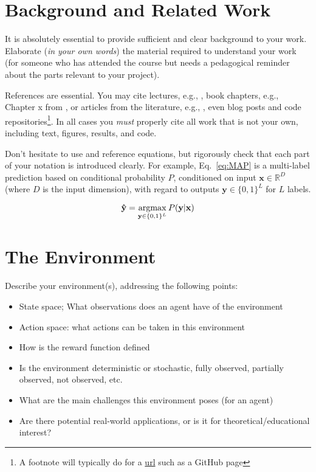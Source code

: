 \documentclass[journal, a4paper]{IEEEtran}
\newcommand{\argmax}{\operatornamewithlimits{argmax}}
\newcommand{\x}{\mathbf{x}}
\newcommand{\y}{\mathbf{y}}
\newcommand{\ypred}{\mathbf{\hat y}}
\begin{document}
\section{Background and Related Work}

It is absolutely essential to provide sufficient and clear background to your work. Elaborate (\emph{in your own words}) the material required to understand your work (for someone who has attended the course but needs a pedagogical reminder about the parts relevant to your project). 

References are essential. You may cite lectures, e.g., \cite{Lecture3}, book chapters, e.g., Chapter x from \cite{Barber}, or articles from the literature, e.g., \cite{Astar,DeepMindSC2}, even blog posts and code repositories\footnote{A footnote will typically do for a \url{url} such as a GitHub page}. In all cases you \emph{must} properly cite all work that is not your own, including text, figures, results, and code.

Don't hesitate to use and reference equations, but rigorously check that each part of your notation is introduced clearly. For example, Eq.~\eqref{eq:MAP} is a multi-label prediction based on conditional probability $P$, conditioned on input $\x \in \mathbb{R}^D$ (where $D$ is the input dimension), with regard to outputs $\y \in \{0,1\}^L$ for $L$ labels. 

\begin{equation}
	\label{eq:MAP}
	\ypred = \argmax_{\y \in \{0,1\}^L} P(\y|\x)
\end{equation}

\section{The Environment}

Describe your environment(s), addressing the following points:

\begin{itemize}
	\item State space; What observations does an agent have of the environment
	\item Action space: what actions can be taken in this environment
	\item How is the reward function defined
	\item Is the environment deterministic or stochastic, fully observed, partially observed, not observed, etc. 
	\item What are the main challenges this environment poses (for an agent)
	\item Are there potential real-world applications, or is it for theoretical/educational interest?
\end{itemize}
\end{document}
